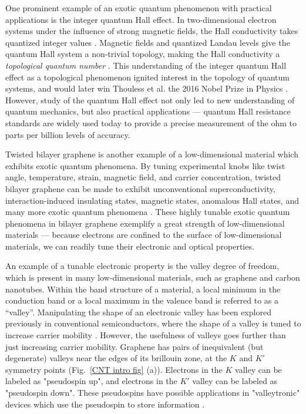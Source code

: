 \documentclass{beavtex_dub_edit}
\begin{document}
One prominent example of an exotic quantum phenomenon with practical applications is the integer quantum Hall effect. In two-dimensional electron systems under the influence of strong magnetic fields, the Hall conductivity takes quantized integer values \cite{wakabayashi_hall_1978}. Magnetic fields and quantized Landau levels give the quantum Hall system a non-trivial topology, making the Hall conductivity a \textit{topological quantum number} \cite{thouless_quantized_1982}. This understanding of the integer quantum Hall effect as a topological phenomenon ignited interest in the topology of quantum systems, and would later win Thouless et al. the 2016 Nobel Prize in Physics \cite{noauthor_nobel_nodate}. However, study of the quantum Hall effect not only led to new understanding of quantum mechanics, but also practical applications — quantum Hall resistance standards are widely used today to provide a precise measurement of the ohm to parts per billion levels of accuracy. 

Twisted bilayer graphene is another example of a low-dimensional material which exhibits exotic quantum phenomena. By tuning experimental knobs like twist angle, temperature, strain, magnetic field, and carrier concentration, twisted bilayer graphene can be made to exhibit unconventional superconductivity, interaction-induced insulating states, magnetic states, anomalous Hall states, and many more exotic quantum phenomena \cite{andrei_graphene_2020}. These highly tunable exotic quantum phenomena in bilayer graphene exemplify a great strength of low-dimensional materials — because electrons are confined to the surface of low-dimensional materials, we can readily tune their electronic and optical properties.

An example of a tunable electronic property is the valley degree of freedom, which is present in many low-dimensional materials, such as graphene and carbon nanotubes. Within the band structure of a material, a local minimum in the conduction band or a local maximum in the valence band is referred to as a “valley”. Manipulating the shape of an electronic valley has been explored previously in conventional semiconductors, where the shape of a valley is tuned to increase carrier mobility \cite{thompson_90-nm_2004}. However, the usefulness of valleys goes further than just increasing carrier mobility. Graphene has pairs of inequivalent (but degenerate) valleys near the edges of its brillouin zone, at the $K$ and $K'$ symmetry points (Fig.\ \ref{CNT intro fig} (a)). Electrons in the $K$ valley can be labeled as "pseudospin up", and electrons in the $K'$ valley can be labeled as "pseudospin down". These pseudospins have possible applications in "valleytronic" devices which use the pseudospin to store information \cite{schaibley_valleytronics_2016}. 
\end{document}
